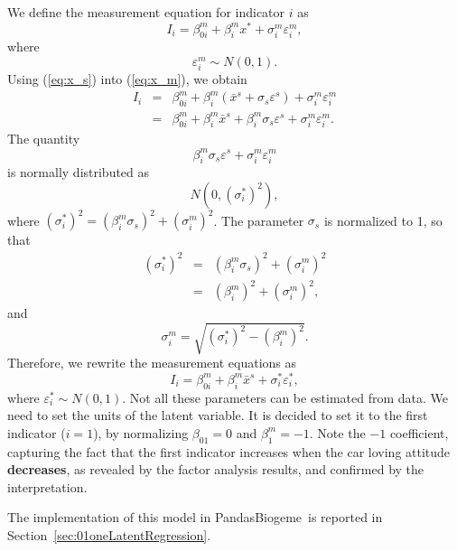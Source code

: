 \documentclass[12pt,a4paper]{article}
\newcommand{\req}[1]{(\ref{#1})}
\newcommand{\PDBIOGEME}{PandasBiogeme}
\begin{document}
We define the measurement equation for indicator $i$ as 
\begin{equation}
\label{eq:x_m}
I_i =  \beta_{0i}^m +\beta^m_i x^* + \sigma^m_i \varepsilon^{m}_i,
\end{equation}
where 
\begin{equation}
\varepsilon^{m}_i \sim N(0,1).
\end{equation}
Using \req{eq:x_s} into \req{eq:x_m}, we obtain
\begin{equation}
\begin{array}{rcl}
I_i &=&  \beta_{0i}^m +\beta^m_i (\bar{x}^s + \sigma_s
\varepsilon^s)  + \sigma^m_i \varepsilon^{m}_i \\
  &=&  \beta_{0i}^m +\beta^m_i \bar{x}^s + \beta^m_i\sigma_s\varepsilon^s +  \sigma^m_i\varepsilon^{m}_i.
\end{array}
\end{equation}
The quantity
\begin{equation}
 \beta^m_i\sigma_s\varepsilon^s +  \sigma^m_i\varepsilon^{m}_i
\end{equation}
 is  normally distributed as
\begin{equation}
N\left(0,(\sigma_i^*)^2\right),
\end{equation}
where $(\sigma_i^*)^2 =(\beta^m_i\sigma_s)^2 +(\sigma^m_i)^2$. The parameter $\sigma_s$ is
normalized to 1, so that
\[
\begin{array}{rcl} 
(\sigma_i^*)^2 & =&(\beta^m_i\sigma_s)^2 +(\sigma^m_i)^2 \\
               & =&(\beta^m_i)^2 +(\sigma^m_i)^2,
\end{array}
\]
and
 \[
\sigma^m_i = \sqrt{(\sigma_i^*)^2 - (\beta^m_i)^2}.
\]
 Therefore, we rewrite the
measurement equations as 
\begin{equation}
\label{eq:measurementCoded}
I_i =  \beta_{0i}^m +\beta^m_i \bar{x}^s + \sigma^*_i \varepsilon_i^*,
\end{equation}
where $\varepsilon_i^* \sim N(0,1)$.
Not all these parameters can be estimated from data. We need to set
the units of the  latent variable. It is decided to set it to the
first indicator ($i=1$), by normalizing
  $\beta_{01}=0$ and $\beta^m_1 = -1$. 
Note the $-1$ coefficient, capturing the fact that the first indicator
increases when the car loving attitude \textbf{decreases}, as revealed
by the factor analysis results, and confirmed by the interpretation. 

The implementation of this model in \PDBIOGEME\ is reported in
Section~\ref{sec:01oneLatentRegression}. 
\end{document}
